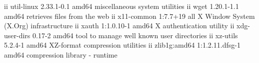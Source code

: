 ii  util-linux                 2.33.1-0.1                  amd64        miscellaneous system utilities
ii  wget                       1.20.1-1.1                  amd64        retrieves files from the web
ii  x11-common                 1:7.7+19                    all          X Window System (X.Org) infrastructure
ii  xauth                      1:1.0.10-1                  amd64        X authentication utility
ii  xdg-user-dirs              0.17-2                      amd64        tool to manage well known user directories
ii  xz-utils                   5.2.4-1                     amd64        XZ-format compression utilities
ii  zlib1g:amd64               1:1.2.11.dfsg-1             amd64        compression library - runtime
